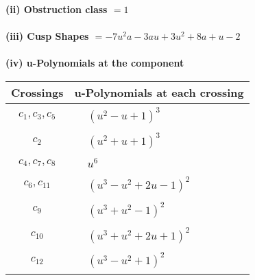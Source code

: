 \documentclass[1p]{elsarticle_modified}
\theoremstyle{definition}
\begin{document}
\flushleft \textbf{(ii) Obstruction class $= 1$}\\~\\
\flushleft \textbf{(iii) Cusp Shapes $= -7 u^2 a-3 a u+3 u^2+8 a+u-2$}\\~\\
\newpage\renewcommand{\arraystretch}{1}
\flushleft \textbf{(iv) u-Polynomials at the component}\newline \\
\begin{tabular}{m{50pt}|m{274pt}}
Crossings & \hspace{64pt}u-Polynomials at each crossing \\
\hline $$\begin{aligned}c_{1},c_{3},c_{5}\end{aligned}$$&$\begin{aligned}
&(u^2- u+1)^3
\end{aligned}$\\
\hline $$\begin{aligned}c_{2}\end{aligned}$$&$\begin{aligned}
&(u^2+u+1)^3
\end{aligned}$\\
\hline $$\begin{aligned}c_{4},c_{7},c_{8}\end{aligned}$$&$\begin{aligned}
&u^6
\end{aligned}$\\
\hline $$\begin{aligned}c_{6},c_{11}\end{aligned}$$&$\begin{aligned}
&(u^3- u^2+2 u-1)^2
\end{aligned}$\\
\hline $$\begin{aligned}c_{9}\end{aligned}$$&$\begin{aligned}
&(u^3+u^2-1)^2
\end{aligned}$\\
\hline $$\begin{aligned}c_{10}\end{aligned}$$&$\begin{aligned}
&(u^3+u^2+2 u+1)^2
\end{aligned}$\\
\hline $$\begin{aligned}c_{12}\end{aligned}$$&$\begin{aligned}
&(u^3- u^2+1)^2
\end{aligned}$\\
\hline
\end{tabular}\\~\\
\end{document}

